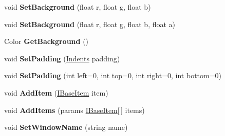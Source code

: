 \begin{DoxyCompactItemize}
\item 
\mbox{\label{class_space_v_i_l_1_1_window_layout_a511d10188154a364aaa32749e408708e}} 
void {\bfseries Set\+Background} (float r, float g, float b)
\item 
\mbox{\label{class_space_v_i_l_1_1_window_layout_a7b08682a56d5034c9a9cf575667d0275}} 
void {\bfseries Set\+Background} (float r, float g, float b, float a)
\item 
\mbox{\label{class_space_v_i_l_1_1_window_layout_a9e01f322dddc3a2a8ba1fc81f180810d}} 
Color {\bfseries Get\+Background} ()
\item 
\mbox{\label{class_space_v_i_l_1_1_window_layout_a6cf0e14f24eec970de1b2e635cad3698}} 
void {\bfseries Set\+Padding} (\mbox{\hyperlink{struct_space_v_i_l_1_1_decorations_1_1_indents}{Indents}} padding)
\item 
\mbox{\label{class_space_v_i_l_1_1_window_layout_ae08245e87a3f6c33c991df42ed74a256}} 
void {\bfseries Set\+Padding} (int left=0, int top=0, int right=0, int bottom=0)
\item 
\mbox{\label{class_space_v_i_l_1_1_window_layout_aaa12165b9e788fa6a3c8f4bcd2c45878}} 
void {\bfseries Add\+Item} (\mbox{\hyperlink{interface_space_v_i_l_1_1_core_1_1_i_base_item}{I\+Base\+Item}} item)
\item 
\mbox{\label{class_space_v_i_l_1_1_window_layout_a69ea03d6a085cefcd836767b628b7d0f}} 
void {\bfseries Add\+Items} (params \mbox{\hyperlink{interface_space_v_i_l_1_1_core_1_1_i_base_item}{I\+Base\+Item}}\mbox{[}$\,$\mbox{]} items)
\item 
\mbox{\label{class_space_v_i_l_1_1_window_layout_a170e7969d999f88abfa994f80aad2dfc}} 
void {\bfseries Set\+Window\+Name} (string name)
\item 
\mbox{\label{class_space_v_i_l_1_1_window_layout_a640675f8ea3219ed7b05e54253c20ebf}} 

\end{DoxyCompactItemize}
